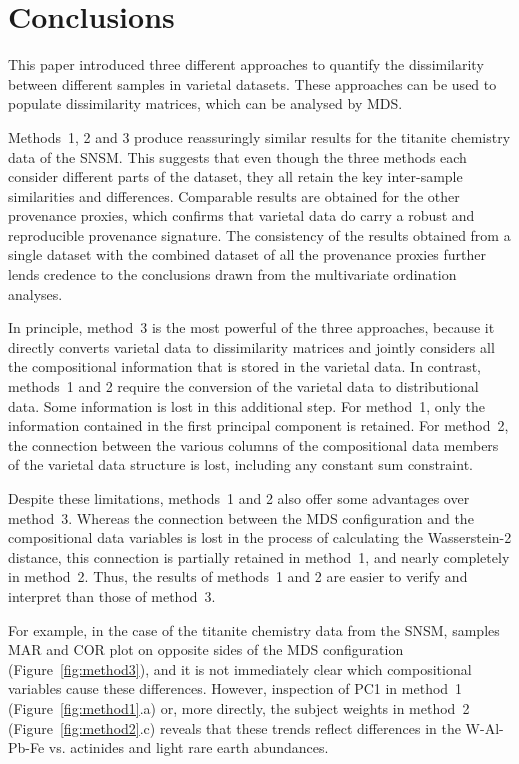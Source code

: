 \documentclass{article}
\begin{document}
\section{Conclusions}\label{sec:conclusions}

This paper introduced three different approaches to quantify the
dissimilarity between different samples in varietal datasets.  These
approaches can be used to populate dissimilarity matrices, which can
be analysed by MDS.\medskip

Methods~1, 2 and 3 produce reassuringly similar results for the
titanite chemistry data of the SNSM.  This suggests that even though
the three methods each consider different parts of the dataset, they
all retain the key inter-sample similarities and
differences. Comparable results are obtained for the other provenance
proxies, which confirms that varietal data do carry a robust and
reproducible provenance signature. The consistency of the results
obtained from a single dataset with the combined dataset of all the
provenance proxies further lends credence to the conclusions drawn
from the multivariate ordination analyses.\medskip

In principle, method~3 is the most powerful of the three approaches,
because it directly converts varietal data to dissimilarity matrices
and jointly considers all the compositional information that is stored
in the varietal data. In contrast, methods~1 and 2 require the
conversion of the varietal data to distributional data. Some
information is lost in this additional step. For method~1, only the
information contained in the first principal component is retained.
For method~2, the connection between the various columns of the
compositional data members of the varietal data structure is lost,
including any constant sum constraint.\medskip

Despite these limitations, methods~1 and 2 also offer some advantages
over method~3. Whereas the connection between the MDS configuration
and the compositional data variables is lost in the process of
calculating the Wasserstein-2 distance, this connection is partially
retained in method~1, and nearly completely in method~2. Thus, the
results of methods~1 and 2 are easier to verify and interpret than
those of method~3.\medskip

For example, in the case of the titanite chemistry data from the SNSM,
samples MAR and COR plot on opposite sides of the MDS configuration
(Figure~\ref{fig:method3}), and it is not immediately clear which
compositional variables cause these differences. However, inspection
of PC1 in method~1 (Figure~\ref{fig:method1}.a) or, more directly, the
subject weights in method~2 (Figure~\ref{fig:method2}.c) reveals that
these trends reflect differences in the W-Al-Pb-Fe vs. actinides and
light rare earth abundances.\medskip
\end{document}
